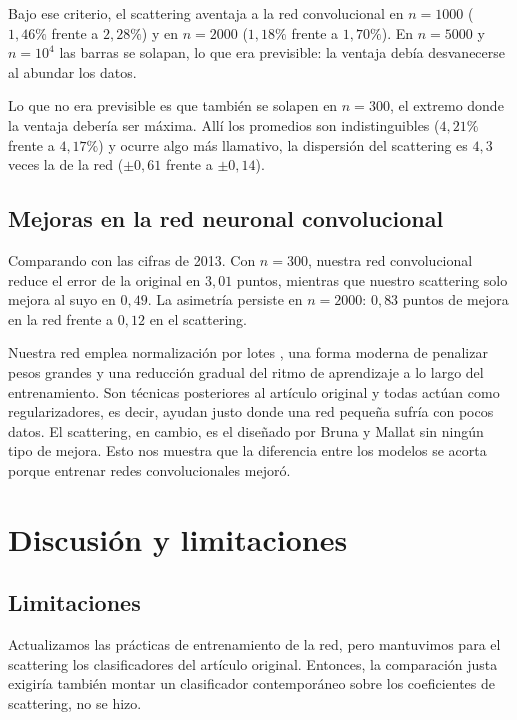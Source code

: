 \documentclass[twocolumn,10pt,a4paper]{article}
\begin{document}
Bajo ese criterio, el scattering aventaja a la red convolucional en $n=1000$
($1{,}46\%$ frente a $2{,}28\%$) y en $n=2000$ ($1{,}18\%$ frente a $1{,}70\%$).
En $n=5000$ y $n=10^4$ las barras se solapan, lo que era previsible: la ventaja
debía desvanecerse al abundar los datos.

Lo que no era previsible es que también se solapen en $n=300$, el extremo donde
la ventaja debería ser máxima. Allí los promedios son indistinguibles
($4{,}21\%$ frente a $4{,}17\%$) y ocurre algo más llamativo, la dispersión del
scattering es $4{,}3$ veces la de la red ($\pm0{,}61$ frente a $\pm0{,}14$).

\subsection{Mejoras en la  red neuronal convolucional}

Comparando con las cifras de 2013. Con $n=300$,
nuestra red convolucional reduce el error de la original en $3{,}01$ puntos,
mientras que nuestro scattering solo mejora al suyo en $0{,}49$. La asimetría
persiste en $n=2000$: $0{,}83$ puntos de mejora en la red frente a $0{,}12$ en
el scattering.

Nuestra red emplea normalización por lotes
\cite{ioffe2015}, una forma moderna de penalizar pesos grandes
\cite{loshchilov2019} y una reducción gradual del ritmo de aprendizaje a lo
largo del entrenamiento. Son técnicas posteriores al artículo original y todas
actúan como regularizadores, es decir, ayudan justo donde una red pequeña sufría
con pocos datos. El scattering, en cambio, es
el diseñado por Bruna y Mallat sin ningún tipo de mejora. Esto nos muestra que la diferencia entre los modelos se acorta porque entrenar redes convolucionales mejoró.

\section{Discusión y limitaciones}

\subsection*{Limitaciones}

Actualizamos las prácticas de
entrenamiento de la red, pero mantuvimos para el scattering los clasificadores
del artículo original. Entonces, la comparación
justa exigiría también montar un clasificador contemporáneo sobre los
coeficientes de scattering, no se hizo.
\end{document}
